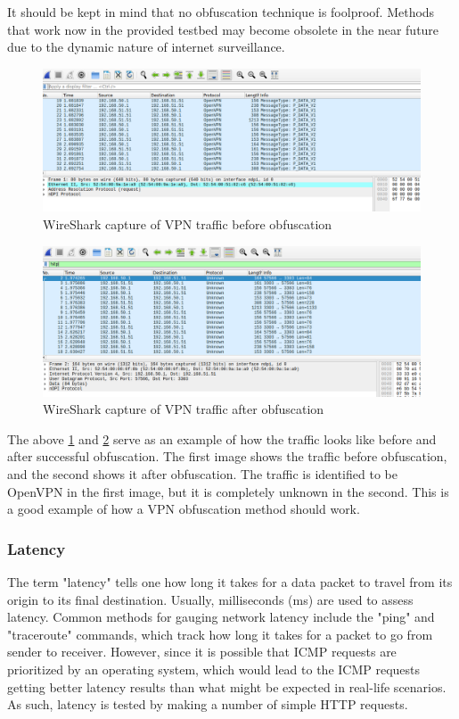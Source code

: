 \documentclass[12pt, fleqn, a4paper]{article}
\begin{document}
It should be kept in mind that no obfuscation technique is foolproof. Methods that work now in the provided testbed may become obsolete in the near future due to the dynamic nature of internet surveillance. 
\begin{figure}[H]
	\centering
	\includegraphics[width=1\textwidth]{img/before}
	\caption{WireShark capture of VPN traffic before obfuscation}
  \label{fig:before}
\end{figure}
\begin{figure}[H]
	\centering
	\includegraphics[width=1\textwidth]{img/after}
	\caption{WireShark capture of VPN traffic after obfuscation}
  \label{fig:after}
\end{figure}
The above \cref{fig:before} and \cref{fig:after} serve as an example of how the traffic looks like before and after successful obfuscation. The first image shows the traffic before obfuscation, and the second shows it after obfuscation. The traffic is identified to be OpenVPN in the first image, but it is completely unknown in the second. This is a good example of how a VPN obfuscation method should work.

\subsubsection{Latency}
The term "latency" tells one how long it takes for a data packet to travel from its origin to its final destination. Usually, milliseconds (ms) are used to assess latency. Common methods for gauging network latency include the "ping" and "traceroute" commands, which track how long it takes for a packet to go from sender to receiver. However, since it is possible that ICMP requests are prioritized by an operating system, which would lead to the ICMP requests getting better latency results than what might be expected in real-life scenarios. As such, latency is tested by making a number of simple HTTP requests.
\end{document}
